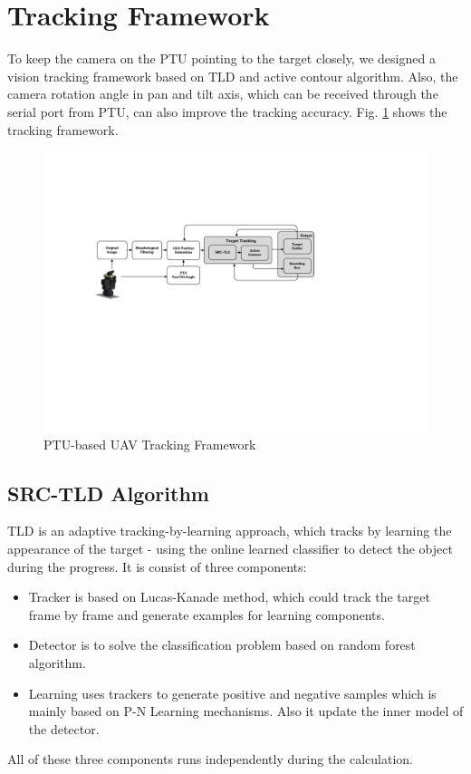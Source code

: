 \section{Tracking Framework}
To keep the camera on the PTU pointing to the target closely, we designed a   vision tracking framework based on TLD and active contour algorithm. Also, the camera rotation angle in pan and tilt axis, which can be received through the serial port from PTU, can also improve the tracking accuracy. Fig. \ref{fig:sci01_tracking_framework} shows the tracking framework.

\begin{figure}[!th]
	\centering
	\includegraphics[width=\textwidth]{Figs/sci01_tracking_framework.pdf}	
	\caption{PTU-based UAV Tracking Framework}
	\label{fig:sci01_tracking_framework}
\end{figure}

\subsection{SRC-TLD Algorithm}
TLD is an adaptive tracking-by-learning approach, which tracks by learning the appearance of the target - using the online learned classifier to detect the object during the progress. It is consist of three components: 
\begin{itemize}
	\item Tracker is based on Lucas-Kanade method, which could track the target frame by frame and generate examples for learning components.
	
	\item Detector is to solve the classification problem based on random forest algorithm.
	
	\item Learning uses trackers to generate positive and negative samples which is mainly based on P-N Learning mechanisms. Also it update the inner model of the detector.
\end{itemize}
All of these three components runs independently during the calculation.

